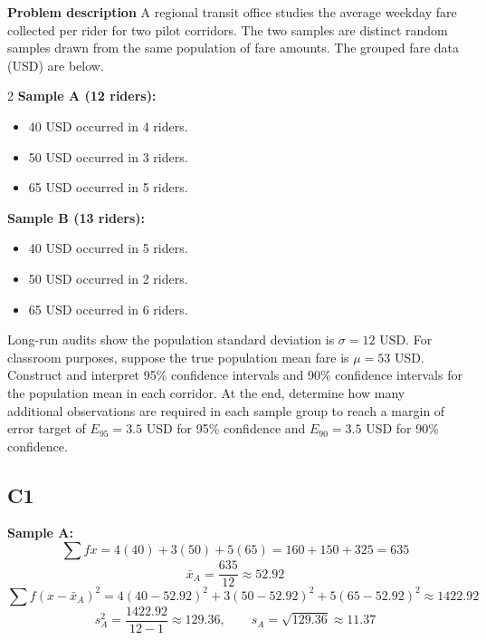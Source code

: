 	\begin{ExamProblems}
		\newpage
		\item
		\textbf{Problem description}
		A regional transit office studies the average weekday fare collected per rider for two pilot corridors.
		The two samples are distinct random samples drawn from the same population of fare amounts.
		The grouped fare data (USD) are below.
		
		\begin{multicols}{2}
			\textbf{Sample A (12 riders):}
			\begin{itemize}
				\item 40 USD occurred in 4 riders.
				\item 50 USD occurred in 3 riders.
				\item 65 USD occurred in 5 riders.
			\end{itemize}
			
			\columnbreak
			
			\textbf{Sample B (13 riders):}
			\begin{itemize}
				\item 40 USD occurred in 5 riders.
				\item 50 USD occurred in 2 riders.
				\item 65 USD occurred in 6 riders.
			\end{itemize}
		\end{multicols}
		
		Long-run audits show the population standard deviation is $\sigma = 12$ USD.
		For classroom purposes, suppose the true population mean fare is $\mu = 53$ USD.
		Construct and interpret 95\% confidence intervals and 90\% confidence intervals for the population mean in each corridor.
		At the end, determine how many additional observations are required in each sample group to reach a margin of error target of $E_{95} = 3.5$ USD for 95\% confidence and $E_{90} = 3.5$ USD for 90\% confidence.
		
		\subsection*{C1}
		\textbf{Sample A:}
		\[
		\sum f x = 4(40) + 3(50) + 5(65) = 160 + 150 + 325 = 635
		\]
		\[
		\bar{x}_A = \frac{635}{12} \approx 52.92
		\]
		\[
		\sum f(x-\bar{x}_A)^2 = 4(40-52.92)^2 + 3(50-52.92)^2 + 5(65-52.92)^2 \approx 1422.92
		\]
		\[
		s_A^2 = \frac{1422.92}{12-1} \approx 129.36, \qquad s_A = \sqrt{129.36} \approx 11.37
		\]
		

\end{ExamProblems}
